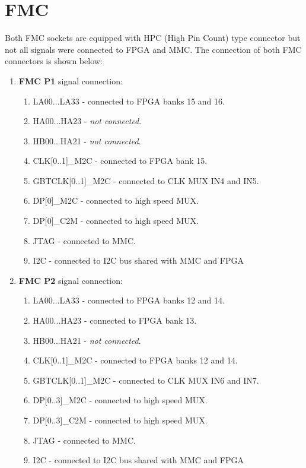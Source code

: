 \documentclass[12pt,oneside,a4]{article}
\begin{document}
\section{FMC}
Both FMC sockets are equipped with HPC (High Pin Count) type connector but not all signals were connected to FPGA and MMC.
The connection of both FMC connectors is shown below:
\begin{enumerate}
    \item \textbf{FMC P1} signal connection:
    \begin{enumerate}
        \item LA00...LA33 - connected to FPGA banks 15 and 16.
        \item HA00...HA23 - \textit{not connected}.
        \item HB00...HA21 - \textit{not connected}.
        \item CLK[0..1]\_M2C - connected to FPGA bank 15.
        \item GBTCLK[0..1]\_M2C - connected to CLK MUX IN4 and IN5.
        \item DP[0]\_M2C - connected to high speed MUX.
        \item DP[0]\_C2M - connected to high speed MUX.
        \item JTAG - connected to MMC.
        \item I2C - connected to I2C bus shared with MMC and FPGA
    \end{enumerate}
    \item \textbf{FMC P2} signal connection:
    \begin{enumerate}
        \item LA00...LA33 - connected to FPGA banks 12 and 14.
        \item HA00...HA23 - connected to FPGA bank 13.
        \item HB00...HA21 - \textit{not connected}.
        \item CLK[0..1]\_M2C - connected to FPGA banks 12 and 14.
        \item GBTCLK[0..1]\_M2C - connected to CLK MUX IN6 and IN7.
        \item DP[0..3]\_M2C - connected to high speed MUX.
        \item DP[0..3]\_C2M - connected to high speed MUX.
        \item JTAG - connected to MMC.
        \item I2C - connected to I2C bus shared with MMC and FPGA
    \end{enumerate}
\end{enumerate}
\end{document}
